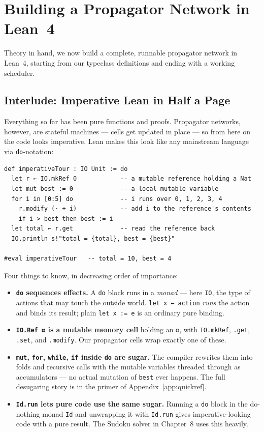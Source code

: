 \documentclass[12pt, a4paper, openright]{book}
\theoremstyle{thmstyle}
\theoremstyle{defstyle}
\newcommand{\lc}[1]{\texttt{#1}}
\begin{document}
\chapter{Building a Propagator Network in Lean~4}

Theory in hand, we now build a complete, runnable propagator network in Lean~4,
starting from our typeclass definitions and ending with a working scheduler.

\section{Interlude: Imperative Lean in Half a Page}

Everything so far has been pure functions and proofs. Propagator networks,
however, are stateful machines --- cells get updated in place --- so from here
on the code looks imperative. Lean makes this look like any mainstream
language via \lc{do}-notation:

\begin{verbatim}
def imperativeTour : IO Unit := do
  let r ← IO.mkRef 0            -- a mutable reference holding a Nat
  let mut best := 0             -- a local mutable variable
  for i in [0:5] do             -- i runs over 0, 1, 2, 3, 4
    r.modify (· + i)            -- add i to the reference's contents
    if i > best then best := i
  let total ← r.get             -- read the reference back
  IO.println s!"total = {total}, best = {best}"

#eval imperativeTour   -- total = 10, best = 4
\end{verbatim}

Four things to know, in decreasing order of importance:
\begin{itemize}
  \item \textbf{\lc{do} sequences effects.} A \lc{do} block runs in a
    \emph{monad} --- here \lc{IO}, the type of actions that may touch the
    outside world. \lc{let x ← action} \emph{runs} the action and binds its
    result; plain \lc{let x := e} is an ordinary pure binding.
  \item \textbf{\lc{IO.Ref α} is a mutable memory cell} holding an \lc{α},
    with \lc{IO.mkRef}, \lc{.get}, \lc{.set}, and \lc{.modify}. Our
    propagator cells wrap exactly one of these.
  \item \textbf{\lc{mut}, \lc{for}, \lc{while}, \lc{if} inside \lc{do} are
    sugar.} The compiler rewrites them into folds and recursive calls with
    the mutable variables threaded through as accumulators --- no actual
    mutation of \lc{best} ever happens. The full desugaring story is in the
    primer of Appendix~\ref{app:quickref}.
  \item \textbf{\lc{Id.run} lets pure code use the same sugar.} Running a
    \lc{do} block in the do-nothing monad \lc{Id} and unwrapping it with
    \lc{Id.run} gives imperative-looking code with a pure result. The Sudoku
    solver in Chapter~8 uses this heavily.
\end{itemize}
\end{document}
